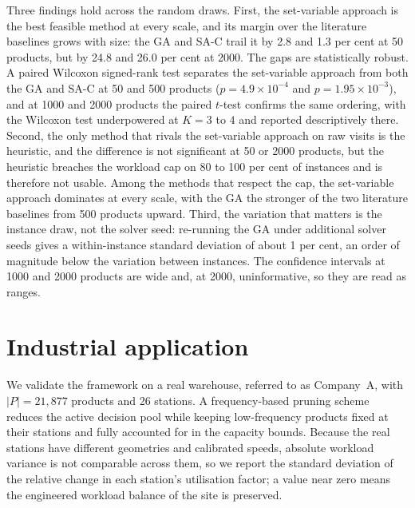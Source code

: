 \documentclass[]{interact}
\begin{document}
Three findings hold across the random draws. First, the set-variable approach is the best feasible method at every scale, and its margin over the literature baselines grows with size: the GA and SA-C trail it by 2.8 and 1.3 per cent at 50 products, but by 24.8 and 26.0 per cent at 2000. The gaps are statistically robust. A paired Wilcoxon signed-rank test separates the set-variable approach from both the GA and SA-C at 50 and 500 products ($p = 4.9\times10^{-4}$ and $p = 1.95\times10^{-3}$), and at 1000 and 2000 products the paired $t$-test confirms the same ordering, with the Wilcoxon test underpowered at $K=3$ to $4$ and reported descriptively there. Second, the only method that rivals the set-variable approach on raw visits is the heuristic, and the difference is not significant at 50 or 2000 products, but the heuristic breaches the workload cap on 80 to 100 per cent of instances and is therefore not usable. Among the methods that respect the cap, the set-variable approach dominates at every scale, with the GA the stronger of the two literature baselines from 500 products upward. Third, the variation that matters is the instance draw, not the solver seed: re-running the GA under additional solver seeds gives a within-instance standard deviation of about 1 per cent, an order of magnitude below the variation between instances. The confidence intervals at 1000 and 2000 products are wide and, at 2000, uninformative, so they are read as ranges.

\section{Industrial application}\label{sec:industrial}
We validate the framework on a real warehouse, referred to as Company~A, with $|P| = 21{,}877$ products and 26 stations. A frequency-based pruning scheme reduces the active decision pool while keeping low-frequency products fixed at their stations and fully accounted for in the capacity bounds. Because the real stations have different geometries and calibrated speeds, absolute workload variance is not comparable across them, so we report the standard deviation of the relative change in each station's utilisation factor; a value near zero means the engineered workload balance of the site is preserved.
\end{document}
